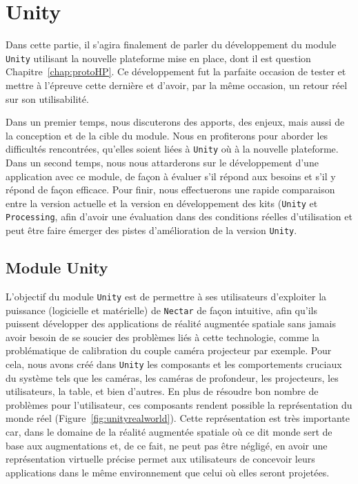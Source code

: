 \chapter{Unity}
\label{chap:unity}

Dans cette partie, il s'agira finalement de parler du développement du module \texttt{Unity} utilisant la nouvelle plateforme mise en place, dont il est question Chapitre~\ref{chap:protoHP}. Ce développement fut la parfaite occasion de tester et mettre à l'épreuve cette dernière et d'avoir, par la même occasion, un retour réel sur son utilisabilité. 

Dans un premier temps, nous discuterons des apports, des enjeux, mais aussi de la conception et de la cible du module. Nous en profiterons pour aborder les difficultés rencontrées, qu'elles soient liées à \texttt{Unity} où à la nouvelle plateforme. Dans un second temps, nous nous attarderons sur le développement d'une application avec ce module, de façon à évaluer s'il répond aux besoins et s'il y répond de façon efficace. Pour finir, nous effectuerons une rapide comparaison entre la version actuelle et la version en développement des kits (\texttt{Unity} et \texttt{Processing}, afin d'avoir une évaluation dans des conditions réelles d'utilisation et peut être faire émerger des pistes d'amélioration de la version \texttt{Unity}.

\section{Module Unity}

L'objectif du module \texttt{Unity} est de permettre à ses utilisateurs d'exploiter la puissance (logicielle et matérielle) de \texttt{Nectar} de façon intuitive, afin qu'ils puissent développer des applications de réalité augmentée spatiale sans jamais avoir besoin de se soucier des problèmes liés à cette technologie, comme la problématique de calibration du couple caméra projecteur par exemple.
Pour cela, nous avons créé dans \texttt{Unity} les composants et les comportements cruciaux du système tels que les caméras, les caméras de profondeur, les projecteurs, les utilisateurs, la table, et bien d'autres. En plus de résoudre bon nombre de problèmes pour l'utilisateur, ces composants rendent possible la représentation du monde réel (Figure~\ref{fig:unityrealworld}). Cette représentation est très importante car, dans le domaine de la réalité augmentée spatiale où ce dit monde sert de base aux augmentations et, de ce fait, ne peut pas être négligé, en avoir une représentation virtuelle précise permet aux utilisateurs de concevoir leurs applications dans le même environnement que celui où elles seront projetées.\\

